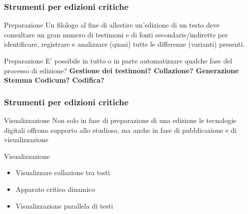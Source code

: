 \begin{frame}
	\frametitle{Strumenti per edizioni critiche}
	\addtocounter{nframe}{1}
    \begin{block}{Preparazione}
        Un filologo al fine di allestire un'edizione di un testo deve consultare un gran numero di testimoni e di fonti secondarie/indirette per identificare, registrare e analizzare (quasi) tutte le differenze (varianti) presenti.        
	\end{block}
	\begin{block}{Preparazione}
      E' possibile in tutto o in parte automatizzare qualche fase del processo di edizione? \textbf{Gestione dei testimoni? Collazione? Generazione Stemma Codicum? Codifica?}
	\end{block}
\end{frame}

\begin{frame}
    \frametitle{Strumenti per edizioni critiche}
    \addtocounter{nframe}{1}
    
    \begin{block}{Visualizzazione}
        Non solo in fase di preparazione di una edizione le tecnologie digitali offrono supporto allo studioso, ma anche in fase di pubblicazione e di visualizzazione
    \end{block}
    
    \begin{block}{Visualizzazione}
        \begin{itemize}
            \item Visualizzare collazione tra testi
            \item Apparato critico dinamico
            \item Visualizzazione parallela di testi
        \end{itemize}
    \end{block}

\end{frame}

